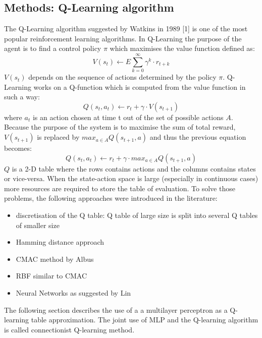 \subsection{Methods: Q-Learning algorithm}
The Q-Learning algorithm suggested by Watkins in 1989 [1] is one of the most popular
reinforcement learning algorithms.
In Q-Learning the purpose of the agent is to find a control policy $\pi$ which maximises the value function defined as:
\begin{equation}
 V(s_t) \leftarrow E{\sum_{k=0}^{\infty} \gamma ^k \cdot r_{t+k}}
\end{equation}
$V(s_t)$ depends on the sequence of actions determined by the policy $\pi$.
Q-Learning works on a Q-function which is computed from the value function in such a way:
\begin{equation}
Q(s_t,a_t) \leftarrow r_t +\gamma \cdot V(s_{t+1})
\end{equation}
where $a_t$ is an action chosen at time t out of the set of possible actions $A$.
Because the purpose of the system is to maximise the sum of total reward, $V(s_{t+1})$ is replaced by
$max_{a \in A} Q(s_{t+1},a)$ and thus the previous equation becomes:
\begin{equation}
Q(s_t,a_t) \leftarrow r_t +\gamma \cdot max_{a \in A} Q(s_{t+1},a)
\end{equation}
$Q$ is a 2-D table where the rows contains actions and the columns contains
states or vice-versa.
When the state-action space is large (especially in continuous cases) more
resources are required to store the table of evaluation.
To solve those problems, the following approaches were introduced in the literature:
\begin{itemize}
\item discretisation of the Q table: Q table of large size is split into several
Q tables of smaller size \citep{BartoSutton1983:Qtable}
\item Hamming distance approach
\item CMAC  method by Albus
\item RBF  similar to CMAC
\item Neural Networks as suggested by Lin \citep{Lin92:memoryapproaches}
\end{itemize}
The following section describes the use of a a multilayer perceptron 
 as a Q-
learning table approximation. The joint use of MLP
and the Q-learning algorithm is called connectionist Q-learning method.
